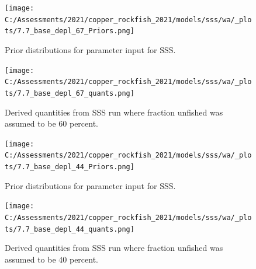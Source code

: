 \documentclass[11pt,
  english,
  a4paper,
]{article}
\begin{document}
\tagmcend\tagstructend

\newpage


\begin{figure}
\centering
\texttt{[image: C:/Assessments/2021/copper\_rockfish\_2021/models/sss/wa/\_plots/7.7\_base\_depl\_67\_Priors.png]}
\caption{Prior distributions for parameter input for SSS.\label{fig:sss-prior-67}}
\end{figure}

\tagmcend\tagstructend

\newpage


\begin{figure}
\centering
\texttt{[image: C:/Assessments/2021/copper\_rockfish\_2021/models/sss/wa/\_plots/7.7\_base\_depl\_67\_quants.png]}
\caption{Derived quantities from SSS run where fraction unfished was assumed to be 60 percent.\label{fig:sss-quant-67}}
\end{figure}

\tagmcend\tagstructend

\newpage


\begin{figure}
\centering
\texttt{[image: C:/Assessments/2021/copper\_rockfish\_2021/models/sss/wa/\_plots/7.7\_base\_depl\_44\_Priors.png]}
\caption{Prior distributions for parameter input for SSS.\label{fig:sss-prior-44}}
\end{figure}

\tagmcend\tagstructend

\newpage


\begin{figure}
\centering
\texttt{[image: C:/Assessments/2021/copper\_rockfish\_2021/models/sss/wa/\_plots/7.7\_base\_depl\_44\_quants.png]}
\caption{Derived quantities from SSS run where fraction unfished was assumed to be 40 percent.\label{fig:sss-quant-44}}
\end{figure}
\end{document}
